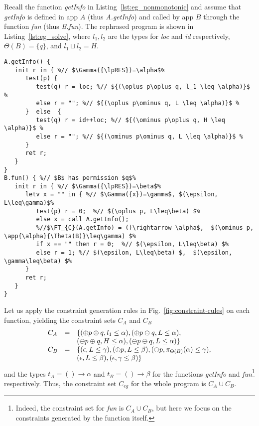 {{{Recall the function \textit{getInfo} in Listing~\ref{lst:eg_nonmonotonic} and assume that \textit{getInfo} is defined in app $A$ (thus \textit{A.getInfo}) and called by app $B$ through the function \textit{fun} (thus \textit{B.fun}). The rephrased program is shown in Listing~\ref{lst:eg_solve}, where $l_1, l_2$ are the types for \textit{loc}  and \textit{id} respectively, $\Theta(B) = \{q\}$, and $l_1\sqcup l_2 = H$.
\begin{lstlisting}[float=tp, caption={The example in Listing~\ref{lst:eg_nonmonotonic} in a calling context.}, label={lst:eg_solve}]
A.getInfo() {
   init r in { %// $\Gamma({\lpRES})=\alpha$%
      test(p) {
         test(q) r = loc; %// ${(\oplus p\oplus q, l_1 \leq \alpha)}$ %
         else r = ""; %// ${(\oplus p\ominus q, L \leq \alpha)}$ %
      }  else  {
         test(q) r = id++loc; %// ${(\ominus p\oplus q, H \leq \alpha)}$ %
         else r = ""; %// ${(\ominus p\ominus q, L \leq \alpha)}$ %
      }
      ret r;   
   }
}
B.fun() { %// $B$ has permission $q$%
   init r in { %// $\Gamma({\lpRES})=\beta$%
      letv x = "" in { %// $\Gamma({x})=\gamma$, $(\epsilon, L\leq\gamma)$%
         test(p) r = 0;  %// $(\oplus p, L\leq\beta) $%
         else x = call A.getInfo();
         %//$\FT_{C}(A.getInfo) = ()\rightarrow \alpha$,  $(\ominus p, \app{\alpha}{\Theta(B)}\leq\gamma) $%
         if x == "" then r = 0;  %// $(\epsilon, L\leq\beta) $%
         else r = 1; %// $(\epsilon, L\leq\beta) $,  $(\epsilon, \gamma\leq\beta) $%
      }
      ret r;    
   }
}
\end{lstlisting}


Let us apply the constraint generation rules in Fig.~\ref{fig:constraint-rules} on each function, yielding the constraint sets $C_A$ and $C_B$
\[
\begin{array}{lcl}
C_A & =  &\{(\oplus p\oplus q, l_1 \leq \alpha),(\oplus p\ominus q, L \leq \alpha), \\
 & & (\ominus p\oplus q, H \leq \alpha), (\ominus p\ominus q, L \leq \alpha) \}\\
C_B & =  & \{(\epsilon, L\leq\gamma), (\oplus p, L\leq\beta) ,(\ominus p, \pi_{{\Theta(B)}}({\alpha})\leq\gamma), \\
& & (\epsilon, L\leq\beta),(\epsilon, \gamma\leq\beta)  \}
\end{array}
\]
and the types $t_A =()\rightarrow \alpha$  and $t_B=()\rightarrow \beta$ for the functions  \textit{getInfo} and  \textit{fun}\footnote{Indeed, the constraint set for \textit{fun} is $C_A \cup C_B $, but here we focus on the constraints generated by the function itself.} respectively. Thus, the constraint set $C_{eg}$ for the whole program is $C_A \cup C_B$.

}}}
